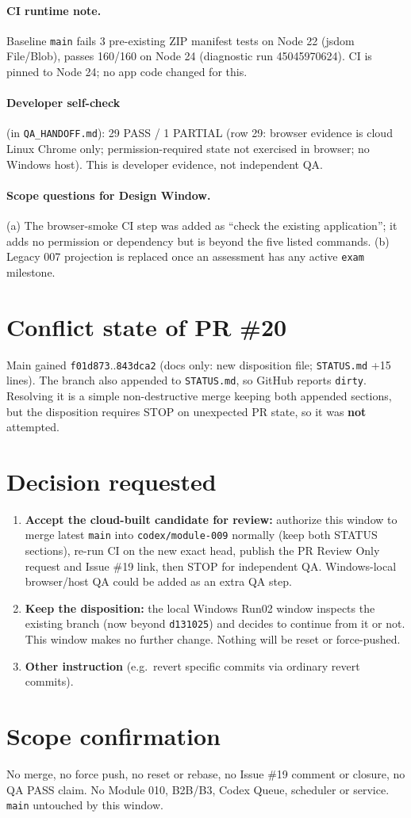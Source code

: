 \documentclass[11pt,a4paper]{article}
\newcommand{\sha}[1]{\texttt{\small #1}}
\begin{document}
\paragraph{CI runtime note.} Baseline \texttt{main} fails 3 pre-existing ZIP manifest tests on Node 22 (jsdom File/Blob), passes 160/160 on Node 24 (diagnostic run 45045970624). CI is pinned to Node 24; no app code changed for this.

\paragraph{Developer self-check} (in \texttt{QA\_HANDOFF.md}): 29 PASS / 1 PARTIAL (row 29: browser evidence is cloud Linux Chrome only; permission-required state not exercised in browser; no Windows host). This is developer evidence, not independent QA.

\paragraph{Scope questions for Design Window.} (a) The browser-smoke CI step was added as ``check the existing application''; it adds no permission or dependency but is beyond the five listed commands. (b) Legacy 007 projection is replaced once an assessment has any active \texttt{exam} milestone.

\section{Conflict state of PR \#20}
Main gained \sha{f01d873}..\sha{843dca2} (docs only: new disposition file; \texttt{STATUS.md} +15 lines). The branch also appended to \texttt{STATUS.md}, so GitHub reports \texttt{dirty}. Resolving it is a simple non-destructive merge keeping both appended sections, but the disposition requires STOP on unexpected PR state, so it was \textbf{not} attempted.

\section{Decision requested}
\begin{enumerate}
  \item \textbf{Accept the cloud-built candidate for review:} authorize this window to merge latest \texttt{main} into \texttt{codex/module-009} normally (keep both STATUS sections), re-run CI on the new exact head, publish the PR Review Only request and Issue \#19 link, then STOP for independent QA. Windows-local browser/host QA could be added as an extra QA step.
  \item \textbf{Keep the disposition:} the local Windows Run02 window inspects the existing branch (now beyond \sha{d131025}) and decides to continue from it or not. This window makes no further change. Nothing will be reset or force-pushed.
  \item \textbf{Other instruction} (e.g.\ revert specific commits via ordinary revert commits).
\end{enumerate}

\section{Scope confirmation}
No merge, no force push, no reset or rebase, no Issue \#19 comment or closure, no QA PASS claim. No Module 010, B2B/B3, Codex Queue, scheduler or service. \texttt{main} untouched by this window.
\end{document}
